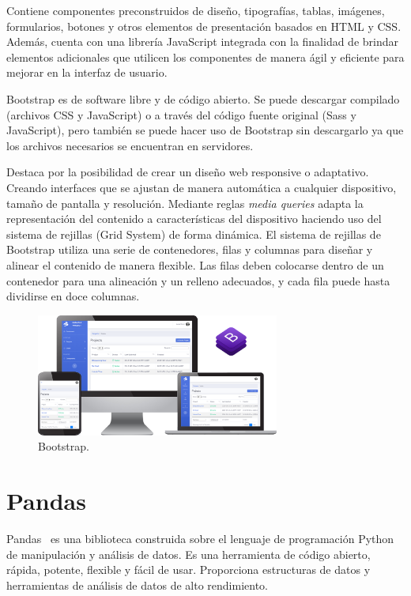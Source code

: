 \documentclass[a4paper, 12pt]{book}
\begin{document}
\vspace{5mm}
Contiene componentes preconstruidos de diseño, tipografías, tablas, imágenes, formularios, botones y otros elementos de presentación basados en HTML y CSS.
Además, cuenta con una librería JavaScript integrada con la finalidad de brindar elementos adicionales que utilicen los componentes de manera ágil y eficiente para mejorar en la interfaz de usuario.

\vspace{5mm}
Bootstrap es de software libre y de código abierto.
Se puede descargar compilado (archivos CSS y JavaScript) o a través del código fuente original (Sass y JavaScript), pero también se puede hacer uso de Bootstrap sin descargarlo ya que los archivos necesarios se encuentran en servidores.

\vspace{5mm}%
Destaca por la posibilidad de crear un diseño web responsive o adaptativo.
Creando interfaces que se ajustan de manera automática a cualquier dispositivo, tamaño de pantalla y resolución.
Mediante reglas \textit{media queries} adapta la representación del contenido a características del dispositivo haciendo uso del sistema de rejillas (Grid System) de forma dinámica.
El sistema de rejillas de Bootstrap utiliza una serie de contenedores, filas y columnas para diseñar y alinear el contenido de manera flexible.
Las filas deben colocarse dentro de un contenedor para una alineación y un relleno adecuados, y cada fila puede hasta dividirse en doce columnas.

\begin{figure}[ht]
  \centering
  \includegraphics[width=8cm, keepaspectratio]{img/bootstrap.png}
  \caption{Bootstrap.}\label{fig:bootstrap}
\end{figure}


\section{Pandas} 
\label{sec:pandas}

Pandas~\cite{pandas} es una biblioteca construida sobre el lenguaje de programación Python de manipulación y análisis de datos.
Es una herramienta de código abierto, rápida, potente, flexible y fácil de usar.
Proporciona estructuras de datos y herramientas de análisis de datos de alto rendimiento.
\end{document}
